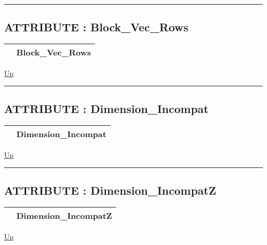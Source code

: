 \rule{\textwidth}{0.4pt}
\subsection*{ATTRIBUTE : Block\_Vec\_Rows}
\hypertarget{ecldoc:pbblas.constants.block_vec_rows}{}

{\renewcommand{\arraystretch}{1.5}
\begin{tabularx}{\textwidth}{|>{\raggedright\arraybackslash}l|X|}
\hline
\hspace{0pt} & Block\_Vec\_Rows \\
\hline
\end{tabularx}
}

\hyperlink{ecldoc:PBblas.Constants}{Up}

\par


\rule{\textwidth}{0.4pt}
\subsection*{ATTRIBUTE : Dimension\_Incompat}
\hypertarget{ecldoc:pbblas.constants.dimension_incompat}{}

{\renewcommand{\arraystretch}{1.5}
\begin{tabularx}{\textwidth}{|>{\raggedright\arraybackslash}l|X|}
\hline
\hspace{0pt} & Dimension\_Incompat \\
\hline
\end{tabularx}
}

\hyperlink{ecldoc:PBblas.Constants}{Up}

\par


\rule{\textwidth}{0.4pt}
\subsection*{ATTRIBUTE : Dimension\_IncompatZ}
\hypertarget{ecldoc:pbblas.constants.dimension_incompatz}{}

{\renewcommand{\arraystretch}{1.5}
\begin{tabularx}{\textwidth}{|>{\raggedright\arraybackslash}l|X|}
\hline
\hspace{0pt} & Dimension\_IncompatZ \\
\hline
\end{tabularx}
}

\hyperlink{ecldoc:PBblas.Constants}{Up}

\par


